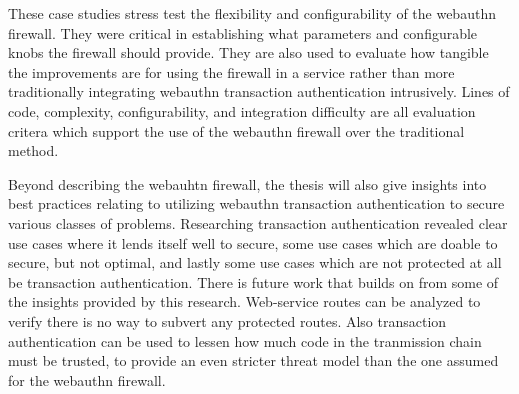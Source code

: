 These case studies stress test the flexibility and configurability of the webauthn firewall. They were critical in establishing what parameters and configurable knobs the firewall should provide. They are also used to evaluate how tangible the improvements are for using the firewall in a service rather than more traditionally integrating webauthn transaction authentication intrusively. Lines of code, complexity, configurability, and integration difficulty are all evaluation critera which support the use of the webauthn firewall over the traditional method.

Beyond describing the webauhtn firewall, the thesis will also give insights into best practices relating to utilizing webauthn transaction authentication to secure various classes of problems. Researching transaction authentication revealed clear use cases where it lends itself well to secure, some use cases which are doable to secure, but not optimal, and lastly some use cases which are not protected at all be transaction authentication. There is future work that builds on from some of the insights provided by this research. Web-service routes can be analyzed to verify there is no way to subvert any protected routes. Also transaction authentication can be used to lessen how much code in the tranmission chain must be trusted, to provide an even stricter threat model than the one assumed for the webauthn firewall. 

\iffalse
in order a protected operation to be processed by the web-server, it must be 

but it is not void of vulnerabilities

with only a few lines of code per HTTP route, the engieer can adapt the firewall to parse and understand whatever input request format the web-service uses. 

specify whether the route gets checked with transaction authentication and what the authentication message should be to pass as valid for that operation. 

Each  how well it can support a vareity of different web applications, each with different 
\fi
